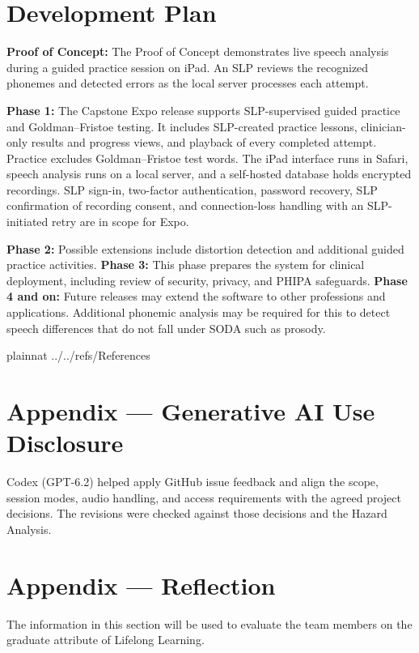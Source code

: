 \documentclass[12pt]{article}
\begin{document}
\normalsize
\clearpage



\section{Development Plan} \label{sec:development-plan}
\textbf{Proof of Concept:}
The Proof of Concept demonstrates live speech analysis during a guided
practice session on iPad. An SLP reviews the recognized phonemes and
detected errors as the local server processes each attempt.

\textbf{Phase 1:}
The Capstone Expo release supports SLP-supervised guided practice and
Goldman--Fristoe testing. It includes SLP-created practice lessons,
clinician-only results and progress views, and playback of every completed
attempt. Practice excludes Goldman--Fristoe test words. The iPad interface
runs in Safari, speech analysis runs on a local server, and a self-hosted
database holds encrypted recordings. SLP sign-in, two-factor authentication,
password recovery, SLP confirmation of recording consent, and
connection-loss handling with an SLP-initiated retry are in scope for Expo.

\textbf{Phase 2:}
Possible extensions include distortion detection and additional guided
practice activities.
\textbf{Phase 3:}
This phase prepares the system for clinical deployment, including review
of security, privacy, and PHIPA safeguards.
\textbf{Phase 4 and on:}
Future releases may extend the software to other professions and applications.
Additional phonemic analysis may be required for this to detect speech differences that do not fall under SODA such as prosody.

\newpage

 {plainnat}
 {../../refs/References}

\newpage

\newpage{}
\section*{Appendix --- Generative AI Use Disclosure}

Codex (GPT-6.2) helped apply GitHub issue feedback and align the scope,
session modes, audio handling, and access requirements with the agreed
project decisions. The revisions were checked against those decisions
and the Hazard Analysis.

\clearpage
\section*{Appendix --- Reflection}

The information in this section will be used to evaluate the team members on the
graduate attribute of Lifelong Learning.  




\end{document}
